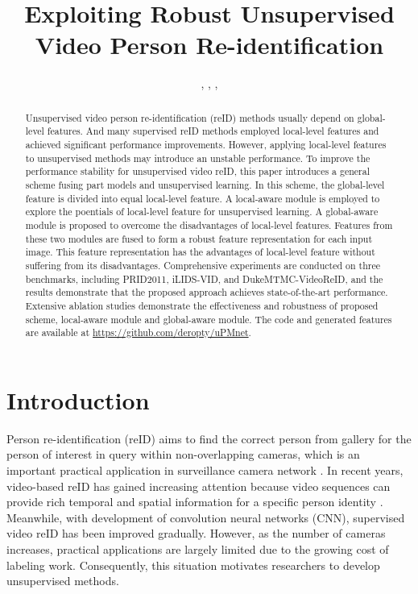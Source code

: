 \documentclass{cta-author}
\begin{document}
	

	\title{Exploiting Robust Unsupervised Video Person Re-identification}
	
	\author{, , , }
	
	\address{
		}
	
	\begin{abstract}
		Unsupervised video person re-identification (reID) methods usually depend on global-level features. And many supervised reID methods employed local-level features and achieved significant performance improvements. However, applying local-level features to unsupervised methods may introduce an unstable performance. To improve the performance stability for unsupervised video reID, this paper introduces a general scheme fusing part models and unsupervised learning. In this scheme, the global-level feature is divided into equal local-level feature. A local-aware module is employed to explore the poentials of local-level feature for unsupervised learning. A global-aware module is proposed to overcome the disadvantages of local-level features. Features from these two modules are fused to form a robust feature representation for each input image. This feature representation has the advantages of local-level feature without suffering from its disadvantages. Comprehensive experiments are conducted on three benchmarks, including PRID2011, iLIDS-VID, and DukeMTMC-VideoReID, and the results demonstrate that the proposed approach achieves state-of-the-art performance. Extensive ablation studies demonstrate the effectiveness and robustness of proposed scheme, local-aware module and global-aware module. The code and generated features are available at \href{https://github.com/deropty/uPMnet}{https://github.com/deropty/uPMnet}.
	\end{abstract}
	
	\maketitle
	
	\section{Introduction} \label{introduction}
	Person re-identification (reID) aims to find the correct person from gallery for the person of interest in query within non-overlapping cameras, which is an important practical application in surveillance camera network \cite{RN528} \cite{RN527} \cite{RN529}. In recent years, video-based reID has gained increasing attention because video sequences can provide rich temporal and spatial information for a specific person identity \cite{RN424} \cite{RN425} \cite{RN418}. Meanwhile, with development of convolution neural networks (CNN), supervised video reID has been improved gradually. However, as the number of cameras increases, practical applications are largely limited due to the growing cost of labeling work. Consequently, this situation motivates researchers to develop unsupervised methods.
	
\end{document}
